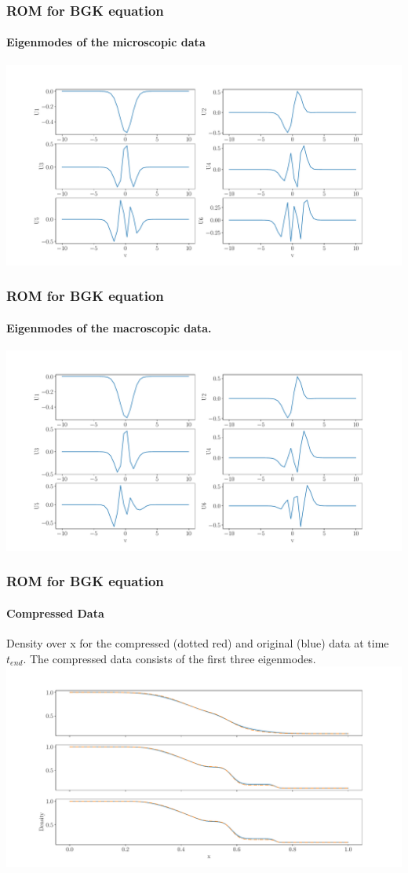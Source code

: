 \documentclass{beamer}
\begin{document}
\begin{frame}
		\frametitle{ROM for BGK equation}
		\framesubtitle{Eigenmodes of the microscopic data} 
			\includegraphics[width=\textwidth]{figures/SixModes25Kn0p01.pdf}
\end{frame}
\begin{frame}
		\frametitle{ROM for BGK equation}
		\framesubtitle{Eigenmodes of the macroscopic data.}
		\includegraphics[width=\textwidth, height=\textheight,keepaspectratio]{figures/SixModes241Kn0p00001richtig.pdf}
\end{frame}
\begin{frame}
		\frametitle{ROM for BGK equation}
		\framesubtitle{Compressed Data}
		Density over x for the compressed (dotted red) and original (blue) data at time $t_{end}$. The compressed data consists of the first three eigenmodes.
	\includegraphics[width=\textwidth, height=0.6\textheight]{figures/TruncDens.pdf}
\end{frame}
\end{document}

